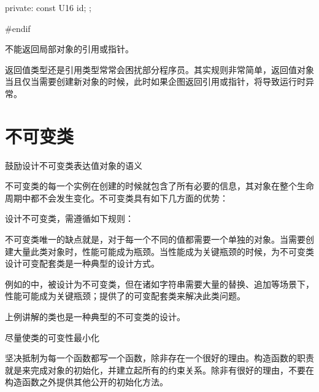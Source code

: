 \begin{content}
\begin{leftbar}
\begin{c++}[caption={domain/GlobalIdentity.h}]
{private:
    const U16 id;	
};

#endif
\end{c++}
\end{leftbar}

\begin{regulation}
不能返回局部对象的引用或指针。
\end{regulation}

返回值类型还是引用类型常常会困扰部分\cpp{}程序员。其实规则非常简单，返回值对象当且仅当需要创建新对象的时候，此时如果企图返回引用或指针，将导致运行时异常。

\end{content}

\section{不可变类}

\begin{content}

\begin{advise}
鼓励设计不可变类表达值对象的语义
\end{advise}

不可变类的每一个实例在创建的时候就包含了所有必要的信息，其对象在整个生命周期中都不会发生变化。不可变类具有如下几方面的优势：
\begin{enum}
\end{enum}

设计不可变类，需遵循如下规则：
\begin{enum}
\end{enum}

不可变类唯一的缺点就是，对于每一个不同的值都需要一个单独的对象。当需要创建大量此类对象时，性能可能成为瓶颈。当性能成为关键瓶颈的时候，为不可变类设计可变配套类是一种典型的设计方式。

例如的中，被设计为不可变类，但在诸如字符串需要大量的替换、追加等场景下，性能可能成为关键瓶颈；提供了的可变配套类来解决此类问题。

上例讲解的类也是一种典型的不可变类的设计。

\begin{regulation}
尽量使类的可变性最小化
\end{regulation}

坚决抵制为每一个函数都写一个函数，除非存在一个很好的理由。构造函数的职责就是来完成对象的初始化，并建立起所有的约束关系。除非有很好的理由，不要在构造函数之外提供其他公开的初始化方法。

\end{content}


